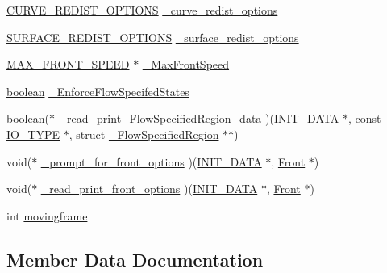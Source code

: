 \begin{DoxyCompactItemize}
\item 
\hyperlink{fdecs_8h_ad4d3270f83bf00f0840e705ca687b246}{C\+U\+R\+V\+E\+\_\+\+R\+E\+D\+I\+S\+T\+\_\+\+O\+P\+T\+I\+O\+NS} \hyperlink{struct___f___i_n_i_t___d_a_t_a_a5d616f43f5d00bbec68618366d91c570}{\+\_\+curve\+\_\+redist\+\_\+options}
\item 
\hyperlink{fdecs_8h_a918b379cff0db156afc89d0ccbb67838}{S\+U\+R\+F\+A\+C\+E\+\_\+\+R\+E\+D\+I\+S\+T\+\_\+\+O\+P\+T\+I\+O\+NS} \hyperlink{struct___f___i_n_i_t___d_a_t_a_a655882b714ab4db2b5a5b420b67806b9}{\+\_\+surface\+\_\+redist\+\_\+options}
\item 
\hyperlink{fdecs_8h_a39ec3151a24738780422b9334f93efbb}{M\+A\+X\+\_\+\+F\+R\+O\+N\+T\+\_\+\+S\+P\+E\+ED} $\ast$ \hyperlink{struct___f___i_n_i_t___d_a_t_a_a0b8156256d2f28bb17541cf56debe0f8}{\+\_\+\+Max\+Front\+Speed}
\item 
\hyperlink{cdecs_8h_ad048433382a936258fb49e2ec4f148e1}{boolean} \hyperlink{struct___f___i_n_i_t___d_a_t_a_af7d985c423d08d75e0bd1e431b66170f}{\+\_\+\+Enforce\+Flow\+Specifed\+States}
\item 
\hyperlink{cdecs_8h_ad048433382a936258fb49e2ec4f148e1}{boolean}($\ast$ \hyperlink{struct___f___i_n_i_t___d_a_t_a_a2ed8c256c9389cbf19b7286ace2bab04}{\+\_\+read\+\_\+print\+\_\+\+Flow\+Specified\+Region\+\_\+data} )(\hyperlink{cdecs_8h_a18423d263765f9b6e78d8f1089446c91}{I\+N\+I\+T\+\_\+\+D\+A\+TA} $\ast$, const \hyperlink{cdecs_8h_ab53ca65803ae78b17636e622a6f2a062}{I\+O\+\_\+\+T\+Y\+PE} $\ast$, struct \hyperlink{struct___flow_specified_region}{\+\_\+\+Flow\+Specified\+Region} $\ast$$\ast$)
\item 
void($\ast$ \hyperlink{struct___f___i_n_i_t___d_a_t_a_a5acba94185a69348d022135a26ea6b00}{\+\_\+prompt\+\_\+for\+\_\+front\+\_\+options} )(\hyperlink{cdecs_8h_a18423d263765f9b6e78d8f1089446c91}{I\+N\+I\+T\+\_\+\+D\+A\+TA} $\ast$, \hyperlink{fdecs_8h_ac32202b798f848095c489cfd04c4ca5f}{Front} $\ast$)
\item 
void($\ast$ \hyperlink{struct___f___i_n_i_t___d_a_t_a_a37a96fb83bfe65521f763db867f04fdc}{\+\_\+read\+\_\+print\+\_\+front\+\_\+options} )(\hyperlink{cdecs_8h_a18423d263765f9b6e78d8f1089446c91}{I\+N\+I\+T\+\_\+\+D\+A\+TA} $\ast$, \hyperlink{fdecs_8h_ac32202b798f848095c489cfd04c4ca5f}{Front} $\ast$)
\item 
int \hyperlink{struct___f___i_n_i_t___d_a_t_a_a0c0d36d387f633914c99a05ae00aec18}{movingframe}
\end{DoxyCompactItemize}


\subsection{Member Data Documentation}
